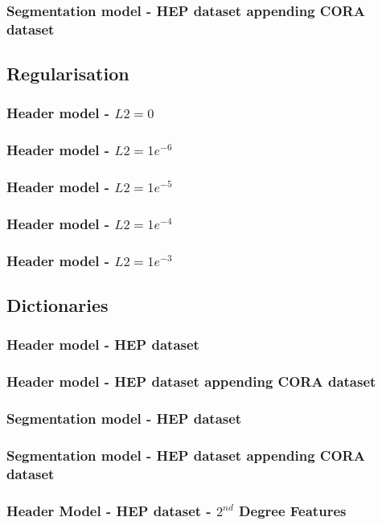 \documentclass[10pt, oneside]{scrartcl}   	%
\begin{document}
\subsubsection{Segmentation model - HEP dataset appending CORA dataset}
\subsection{Regularisation}
\subsubsection{Header model - $L2 = 0$}
\subsubsection{Header model - $L2 = 1e^{-6}$}
\subsubsection{Header model - $L2 = 1e^{-5}$}
\subsubsection{Header model - $L2 = 1e^{-4}$}
\subsubsection{Header model - $L2 = 1e^{-3}$}
\subsection{Dictionaries}
\subsubsection{Header model - HEP dataset}
\subsubsection{Header model - HEP dataset appending CORA dataset}
\subsubsection{Segmentation model - HEP dataset}
\subsubsection{Segmentation model - HEP dataset appending CORA dataset}
\subsubsection{Header Model - HEP dataset - $2^{nd}$ Degree Features}
\end{document}
